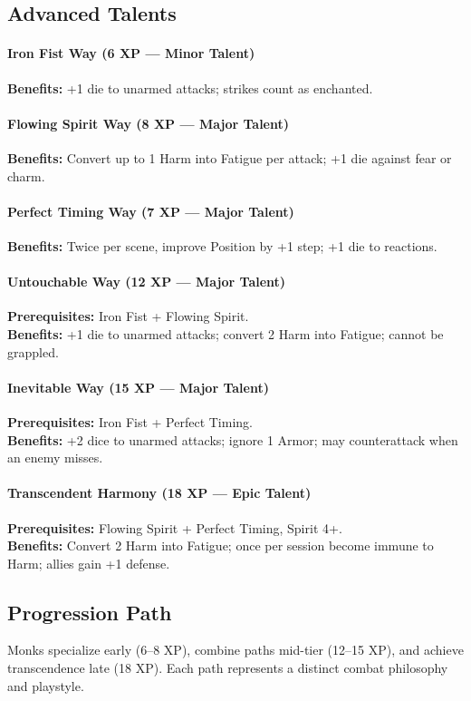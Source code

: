 \subsection*{Advanced Talents}
\paragraph{Iron Fist Way (6 XP --- Minor Talent)} 
\textbf{Benefits:} +1 die to unarmed attacks; strikes count as enchanted.

\paragraph{Flowing Spirit Way (8 XP --- Major Talent)} 
\textbf{Benefits:} Convert up to 1 Harm into Fatigue per attack; +1 die against fear or charm.

\paragraph{Perfect Timing Way (7 XP --- Major Talent)} 
\textbf{Benefits:} Twice per scene, improve Position by +1 step; +1 die to reactions.

\paragraph{Untouchable Way (12 XP --- Major Talent)} 
\textbf{Prerequisites:} Iron Fist + Flowing Spirit. \\
\textbf{Benefits:} +1 die to unarmed attacks; convert 2 Harm into Fatigue; cannot be grappled.

\paragraph{Inevitable Way (15 XP --- Major Talent)} 
\textbf{Prerequisites:} Iron Fist + Perfect Timing. \\
\textbf{Benefits:} +2 dice to unarmed attacks; ignore 1 Armor; may counterattack when an enemy misses.

\paragraph{Transcendent Harmony (18 XP --- Epic Talent)} 
\textbf{Prerequisites:} Flowing Spirit + Perfect Timing, Spirit 4+. \\
\textbf{Benefits:} Convert 2 Harm into Fatigue; once per session become immune to Harm; allies gain +1 defense.

\subsection*{Progression Path}
Monks specialize early (6--8 XP), combine paths mid-tier (12--15 XP), and achieve transcendence late (18 XP). Each path represents a distinct combat philosophy and playstyle.

